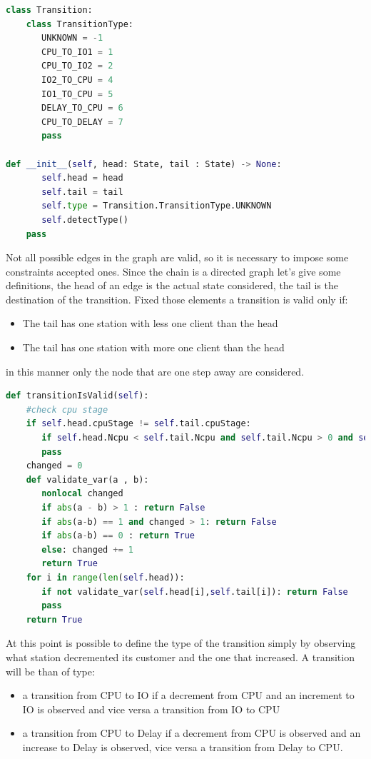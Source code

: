\documentclass[12pt,a4paper]{article}
\begin{document}
\begin{lstlisting}[language=python]
class Transition:   
    class TransitionType:
       UNKNOWN = -1
       CPU_TO_IO1 = 1
       CPU_TO_IO2 = 2
       IO2_TO_CPU = 4
       IO1_TO_CPU = 5
       DELAY_TO_CPU = 6
       CPU_TO_DELAY = 7
       pass

def __init__(self, head: State, tail : State) -> None:
       self.head = head
       self.tail = tail
       self.type = Transition.TransitionType.UNKNOWN
       self.detectType()
    pass
\end{lstlisting}

Not all possible edges in the graph are valid, so it is necessary to impose some constraints accepted ones. Since the chain is a directed graph let's give some definitions, the head of an edge is the actual state considered, the tail is the destination of the transition. Fixed those elements a transition is valid only if:
\begin{itemize}
    \item The tail has one station with less one client than the head 
    \item The tail has one station with more one client than the head 
\end{itemize}
in this manner only the node that are one step away are considered. 

\begin{lstlisting}[language=python,breaklines]
def transitionIsValid(self):
    #check cpu stage
    if self.head.cpuStage != self.tail.cpuStage:
       if self.head.Ncpu < self.tail.Ncpu and self.tail.Ncpu > 0 and self.head.Ncpu > 0: return False
       pass
    changed = 0
    def validate_var(a , b):
       nonlocal changed 
       if abs(a - b) > 1 : return False 
       if abs(a-b) == 1 and changed > 1: return False
       if abs(a-b) == 0 : return True
       else: changed += 1         
       return True
    for i in range(len(self.head)):
       if not validate_var(self.head[i],self.tail[i]): return False
       pass
    return True
\end{lstlisting}

At this point is possible to define the type of the transition simply by observing what station decremented its customer and the one that increased. A transition will be than of type: 

\begin{itemize}
    \item a transition from CPU to IO if a decrement from CPU and an increment to IO is observed and vice versa a transition from IO to CPU 
    \item a transition from CPU to Delay if a decrement from CPU is observed and an increase to Delay is observed, vice versa a transition from Delay to CPU.
\end{itemize}
\end{document}
